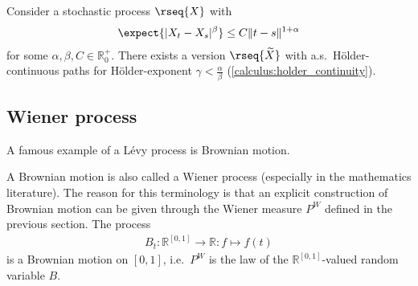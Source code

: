     \begin{theorem}\label{stoch:kolmogorov_continuity_theorem}
        Consider a stochastic process $\rseq{X}$ with
        \begin{gather}
            \expect{|X_t-X_s|^\beta}\leq C\|t-s\|^{1+\alpha}
        \end{gather}
        for some $\alpha,\beta,C\in\mathbb{R}^+_0$. There exists a version $\rseq{\widetilde{X}}$ with a.s.~H\"older-continuous paths for H\"older-exponent $\gamma<\frac{\alpha}{\beta}$ (\cref{calculus:holder_continuity}).
    \end{theorem}

\subsection{Wiener process}


    A famous example of a L\'evy process is Brownian motion.

    \begin{remark}
        A Brownian motion is also called a Wiener process (especially in the mathematics literature). The reason for this terminology is that an explicit construction of Brownian motion can be given through the Wiener measure $P^W$ defined in the previous section. The process
        \begin{gather}
            B_t:\mathbb{R}^{[0,1]}\rightarrow\mathbb{R}:f\mapsto f(t)
        \end{gather}
        is a Brownian motion on $[0,1]$, i.e.~$P^W$ is the law of the $\mathbb{R}^{[0,1]}$-valued random variable $B$.
    \end{remark}

